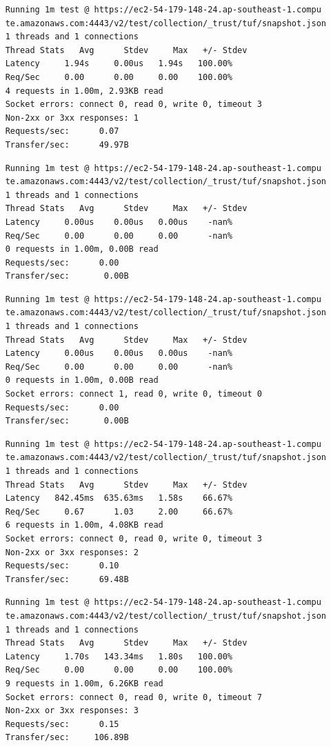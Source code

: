 \documentclass[a4paper,12pt]{article}
\newcounter{subsubsubsection}[subsubsection]
\begin{document}
{{	
	\begin{verbatim}
	Running 1m test @ https://ec2-54-179-148-24.ap-southeast-1.compu
	te.amazonaws.com:4443/v2/test/collection/_trust/tuf/snapshot.json
	1 threads and 1 connections
	Thread Stats   Avg      Stdev     Max   +/- Stdev
	Latency     1.94s     0.00us   1.94s   100.00%
	Req/Sec     0.00      0.00     0.00    100.00%
	4 requests in 1.00m, 2.93KB read
	Socket errors: connect 0, read 0, write 0, timeout 3
	Non-2xx or 3xx responses: 1
	Requests/sec:      0.07
	Transfer/sec:      49.97B
	\end{verbatim}
	\begin{verbatim}
	Running 1m test @ https://ec2-54-179-148-24.ap-southeast-1.compu
	te.amazonaws.com:4443/v2/test/collection/_trust/tuf/snapshot.json
	1 threads and 1 connections
	Thread Stats   Avg      Stdev     Max   +/- Stdev
	Latency     0.00us    0.00us   0.00us    -nan%
	Req/Sec     0.00      0.00     0.00      -nan%
	0 requests in 1.00m, 0.00B read
	Requests/sec:      0.00
	Transfer/sec:       0.00B
	\end{verbatim}
	\begin{verbatim}
	Running 1m test @ https://ec2-54-179-148-24.ap-southeast-1.compu
	te.amazonaws.com:4443/v2/test/collection/_trust/tuf/snapshot.json
	1 threads and 1 connections
	Thread Stats   Avg      Stdev     Max   +/- Stdev
	Latency     0.00us    0.00us   0.00us    -nan%
	Req/Sec     0.00      0.00     0.00      -nan%
	0 requests in 1.00m, 0.00B read
	Socket errors: connect 1, read 0, write 0, timeout 0
	Requests/sec:      0.00
	Transfer/sec:       0.00B
	\end{verbatim}
	\begin{verbatim}
	Running 1m test @ https://ec2-54-179-148-24.ap-southeast-1.compu
	te.amazonaws.com:4443/v2/test/collection/_trust/tuf/snapshot.json
	1 threads and 1 connections
	Thread Stats   Avg      Stdev     Max   +/- Stdev
	Latency   842.45ms  635.63ms   1.58s    66.67%
	Req/Sec     0.67      1.03     2.00     66.67%
	6 requests in 1.00m, 4.08KB read
	Socket errors: connect 0, read 0, write 0, timeout 3
	Non-2xx or 3xx responses: 2
	Requests/sec:      0.10
	Transfer/sec:      69.48B
	\end{verbatim}
	\newpage
	\begin{verbatim}
	Running 1m test @ https://ec2-54-179-148-24.ap-southeast-1.compu
	te.amazonaws.com:4443/v2/test/collection/_trust/tuf/snapshot.json
	1 threads and 1 connections
	Thread Stats   Avg      Stdev     Max   +/- Stdev
	Latency     1.70s   143.34ms   1.80s   100.00%
	Req/Sec     0.00      0.00     0.00    100.00%
	9 requests in 1.00m, 6.26KB read
	Socket errors: connect 0, read 0, write 0, timeout 7
	Non-2xx or 3xx responses: 3
	Requests/sec:      0.15
	Transfer/sec:     106.89B
	\end{verbatim}
	\newpage
	
}}
\end{document}
